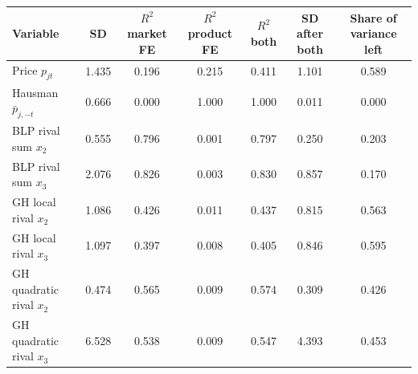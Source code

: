 \begin{tabular}{lcccccc}
\toprule
Variable & SD & $R^2$ market FE & $R^2$ product FE & $R^2$ both & SD after both & Share of variance left \\
\midrule
Price $p_{jt}$ & 1.435 & 0.196 & 0.215 & 0.411 & 1.101 & 0.589 \\
\midrule
Hausman $\bar p_{j,-t}$ & 0.666 & 0.000 & 1.000 & 1.000 & 0.011 & 0.000 \\
BLP rival sum $x_2$ & 0.555 & 0.796 & 0.001 & 0.797 & 0.250 & 0.203 \\
BLP rival sum $x_3$ & 2.076 & 0.826 & 0.003 & 0.830 & 0.857 & 0.170 \\
GH local rival $x_2$ & 1.086 & 0.426 & 0.011 & 0.437 & 0.815 & 0.563 \\
GH local rival $x_3$ & 1.097 & 0.397 & 0.008 & 0.405 & 0.846 & 0.595 \\
GH quadratic rival $x_2$ & 0.474 & 0.565 & 0.009 & 0.574 & 0.309 & 0.426 \\
GH quadratic rival $x_3$ & 6.528 & 0.538 & 0.009 & 0.547 & 4.393 & 0.453 \\
\bottomrule
\end{tabular}
